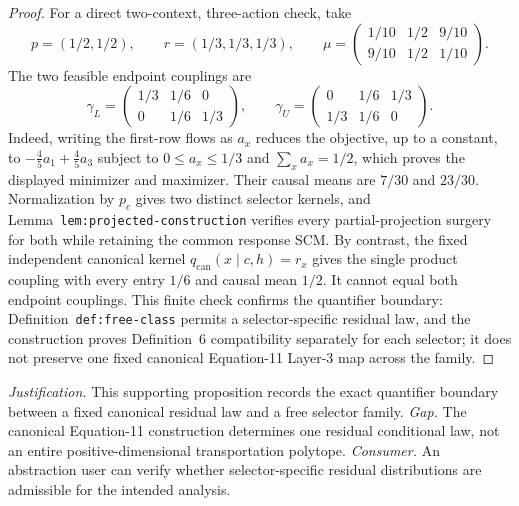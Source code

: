 \documentclass{article}
\begin{document}
\begin{proof}
For a direct two-context, three-action check, take
\[
p=(1/2,1/2),\qquad r=(1/3,1/3,1/3),\qquad
\mu=\begin{pmatrix}1/10&1/2&9/10\\9/10&1/2&1/10\end{pmatrix}.
\]
The two feasible endpoint couplings are
\[
\gamma_L=\begin{pmatrix}1/3&1/6&0\\0&1/6&1/3\end{pmatrix},
\qquad
\gamma_U=\begin{pmatrix}0&1/6&1/3\\1/3&1/6&0\end{pmatrix}.
\]
Indeed, writing the first-row flows as \(a_x\) reduces the objective, up to a constant, to \(-\frac45a_1+\frac45a_3\) subject to \(0\leq a_x\leq1/3\) and \(\sum_xa_x=1/2\), which proves the displayed minimizer and maximizer.  Their causal means are \(7/30\) and \(23/30\).  Normalization by \(p_c\) gives two distinct selector kernels, and Lemma~\texttt{lem:projected-construction} verifies every partial-projection surgery for both while retaining the common response SCM.  By contrast, the fixed independent canonical kernel \(q_{\mathrm{can}}(x\mid c,h)=r_x\) gives the single product coupling with every entry \(1/6\) and causal mean \(1/2\).  It cannot equal both endpoint couplings.  This finite check confirms the quantifier boundary: Definition~\texttt{def:free-class} permits a selector-specific residual law, and the construction proves Definition~6 compatibility separately for each selector; it does not preserve one fixed canonical Equation-11 Layer-3 map across the family.
\end{proof}
\par\smallskip\noindent \textit{Justification.} This supporting proposition records the exact quantifier boundary between a fixed canonical residual law and a free selector family. \textit{Gap.} The canonical Equation-11 construction determines one residual conditional law, not an entire positive-dimensional transportation polytope. \textit{Consumer.} An abstraction user can verify whether selector-specific residual distributions are admissible for the intended analysis.
\end{document}
